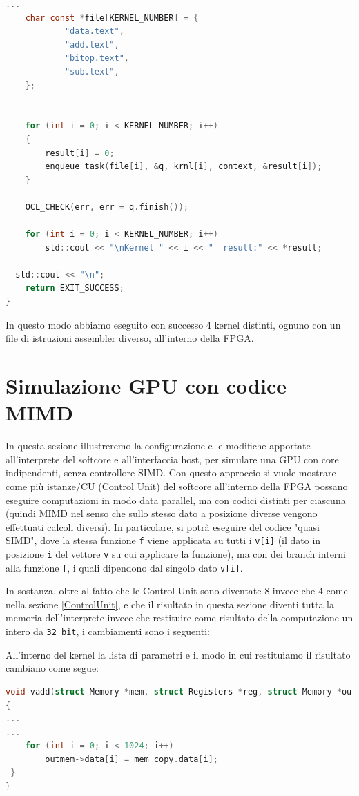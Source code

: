 \begin{lstlisting}[language=C]
...
	char const *file[KERNEL_NUMBER] = {
			"data.text",
			"add.text",
			"bitop.text",
			"sub.text",
	};


	for (int i = 0; i < KERNEL_NUMBER; i++)
	{
		result[i] = 0;
		enqueue_task(file[i], &q, krnl[i], context, &result[i]);
	}

	OCL_CHECK(err, err = q.finish());

	for (int i = 0; i < KERNEL_NUMBER; i++)
		std::cout << "\nKernel " << i << "  result:" << *result;

  std::cout << "\n";
	return EXIT_SUCCESS;
}
\end{lstlisting}
In questo modo abbiamo eseguito con successo 4 kernel distinti, ognuno con un file di istruzioni assembler diverso, all'interno della FPGA.

\section{Simulazione GPU con codice MIMD}
\label{interpretegpu}


In questa sezione illustreremo la configurazione e le modifiche apportate all'interprete del softcore e all'interfaccia host, per simulare una GPU con core indipendenti, senza controllore SIMD. Con questo approccio si vuole mostrare come più istanze/CU (Control Unit) del softcore all'interno della FPGA possano eseguire computazioni in modo data parallel, ma con codici distinti per ciascuna (quindi MIMD nel senso che sullo stesso dato a posizione diverse vengono effettuati calcoli diversi). In particolare, si potrà eseguire del codice "quasi SIMD", dove la stessa funzione \texttt{f} viene applicata su tutti i \texttt{v[i]} (il dato in posizione \texttt{i} del vettore \texttt{v} su cui applicare la funzione), ma con dei branch interni alla funzione \texttt{f}, i quali dipendono dal singolo dato \texttt{v[i]}. 


\vspace{0.3cm}
In sostanza, oltre al fatto che le Control Unit sono diventate 8 invece che 4 come nella sezione \ref{ControlUnit}, e che il risultato in questa sezione diventi tutta la memoria dell'interprete invece che restituire come risultato della computazione un intero da \texttt{32 bit}, i cambiamenti sono i seguenti:

All'interno del kernel la lista di parametri e il modo in cui restituiamo il risultato cambiano come segue:
\begin{lstlisting}[language=C]
void vadd(struct Memory *mem, struct Registers *reg, struct Memory *outmem, ap_uint<32> my_size)
{
...
...
    for (int i = 0; i < 1024; i++)
        outmem->data[i] = mem_copy.data[i];
 }
}
\end{lstlisting}


